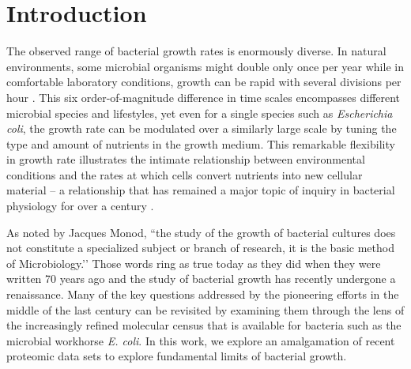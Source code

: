 \section{Introduction}
The observed range of bacterial growth rates is enormously diverse. In
natural environments, some microbial organisms might double only once per
year \citep{mikucki2009} while in comfortable laboratory conditions, growth
can be rapid with several divisions per hour \citep{schaechter1958}. This six
order-of-magnitude difference in time scales encompasses different microbial
species and lifestyles, yet even for a single species such as \textit{Escherichia
coli}, the growth rate can be modulated over a similarly large scale by tuning the
type and amount of nutrients in the growth medium. This remarkable
flexibility in growth rate illustrates the intimate relationship between
environmental conditions and the rates at which cells convert nutrients into
new cellular material -- a relationship that has remained a major topic of
inquiry in bacterial physiology for over a century \citep{jun2018}.

As noted by Jacques Monod, ``the study of the growth of bacterial
cultures does not constitute a specialized subject or branch of research, it
is the basic method of Microbiology.’’ Those words ring as true today as they
did when they were written 70 years ago \citep{monod1949} and the study
of bacterial growth has recently undergone a renaissance. Many of the key questions
addressed by the pioneering efforts in the middle of the last century can be
revisited by examining them through the lens of the increasingly refined
molecular census that is available for bacteria such as the microbial
workhorse \textit{E. coli}. In this work, we explore an amalgamation
of recent proteomic data sets to explore fundamental limits of bacterial growth.

